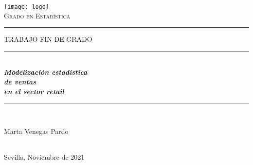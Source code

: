 \documentclass[12pt,a4paper,]{book}
\title{}
\author{}
\date{}
\numberwithin{dummy}{section}
\theoremstyle{ocrenumbox}
\theoremstyle{blacknumex}
\theoremstyle{blacknumbox}
\theoremstyle{ocrenum}
\theoremstyle{ocrenum}
\begin{document}
\begin{titlepage}

\newcommand{\HRule}{\rule{\linewidth}{0.5mm}} %

\center %


\begin{minipage}{14cm}
\center

\texttt{[image: logo]}\\[0.5cm] %


\textsc{\LARGE Grado en Estadística}\\[2.5cm] 



\rule[1.7mm]{2cm}{0.5mm}
\hfill
\textsc{\Large TRABAJO FIN DE GRADO} 
\hfill
\rule[1.7mm]{2cm}{0.5mm} 
\\[0.75cm]

{\Huge
\textbf{\textit{
Modelización estadística \\[0.2cm]
de ventas \\[0.5cm]
en el sector retail
}}}\\[0.75cm] 

\HRule \\[4cm]


{\Large

Marta Venegas Pardo} \\[0.5cm]

{\large
Sevilla, Noviembre de 2021
}

\end{minipage}

\vfill %

\cleardoublepage
\thispagestyle{empty}
\end{titlepage}
\end{document}
